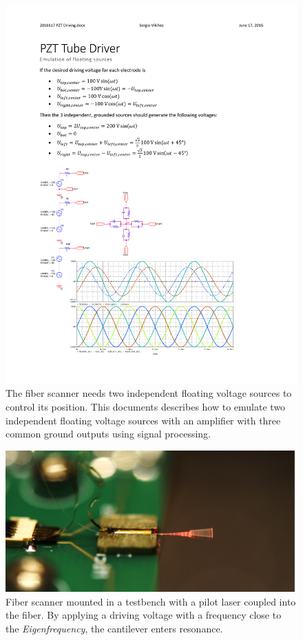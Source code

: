 \begin{figure}[h!]\centering \includegraphics[width=16cm]{appendix/driving.pdf}
      \caption{The fiber scanner needs two independent floating voltage sources to control its position. This documents describes how to emulate two independent floating voltage sources with an amplifier with three common ground outputs using signal processing.}
\end{figure}
\begin{figure}[h!]\centering \includegraphics[width=15cm]{appendix/vibrating.png}
      \caption{Fiber scanner mounted in a testbench with a pilot laser coupled into the fiber. By applying a driving voltage with a frequency close to the \textit{Eigenfrequency}, the cantilever enters resonance.}
\end{figure}


